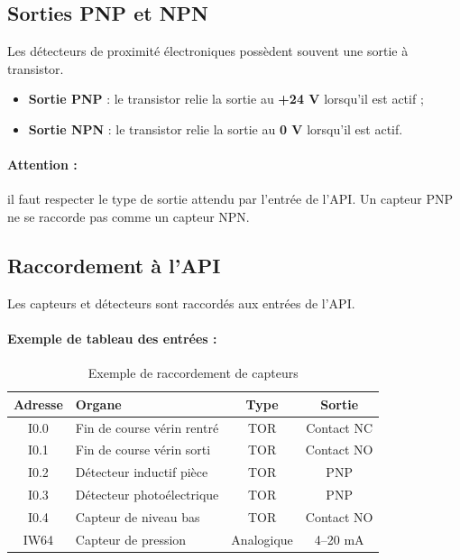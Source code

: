 \subsection{Sorties PNP et NPN}

Les détecteurs de proximité électroniques possèdent souvent une sortie à transistor.

\begin{itemize}
    \item \textbf{Sortie PNP} : le transistor relie la sortie au \textbf{+24 V} lorsqu'il est actif ;
    \item \textbf{Sortie NPN} : le transistor relie la sortie au \textbf{0 V} lorsqu'il est actif.
\end{itemize}

\paragraph{Attention :} il faut respecter le type de sortie attendu par l'entrée de l'API. Un capteur PNP ne se raccorde pas comme un capteur NPN.

\subsection{Raccordement à l'API}

Les capteurs et détecteurs sont raccordés aux entrées de l'API.

\paragraph{Exemple de tableau des entrées :}

\begin{table}[h]
\centering
\begin{tabularx}{\textwidth}{|c|X|c|c|}
\hline
\textbf{Adresse} & \textbf{Organe} & \textbf{Type} & \textbf{Sortie} \\
\hline
I0.0 & Fin de course vérin rentré & TOR & Contact NC \\
\hline
I0.1 & Fin de course vérin sorti & TOR & Contact NO \\
\hline
I0.2 & Détecteur inductif pièce & TOR & PNP \\
\hline
I0.3 & Détecteur photoélectrique & TOR & PNP \\
\hline
I0.4 & Capteur de niveau bas & TOR & Contact NO \\
\hline
IW64 & Capteur de pression & Analogique & 4--20 mA \\
\hline
\end{tabularx}
\caption{Exemple de raccordement de capteurs}
\end{table}

